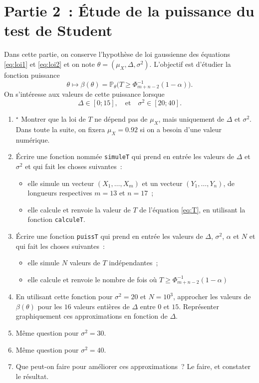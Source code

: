 \documentclass[a4paper,12pt,twosided]{article}
\newcommand{\prob}{\mathbb P}
\theoremstyle{definition}
\begin{document}
\section*{Partie 2~: Étude de la puissance du test de Student}

Dans cette partie, on conserve l'hypothèse de loi gaussienne des équations \eqref{eq:loi1} et
\eqref{eq:loi2} et on note $\theta=(\mu_X, \Delta, \sigma^2)$.
L'objectif est d'étudier la fonction puissance
\[
  \theta \mapsto \beta(\theta) = \prob_\theta\Big(T \ge \Phi_{m+n-2}^{-1}(1-\alpha)\Big).
\]
On s'intéresse aux valeurs de cette puissance lorsque
\begin{equation}
  \label{eq:intervalles}
  \Delta \in [0; 15],\quad \text{et} \quad  \sigma^2\in [20;40].
\end{equation}


\begin{enumerate}[\bf {2.}1.]
\item $^\star$ Montrer que la loi de $T$ ne dépend pas de $\mu_X$, mais uniquement de $\Delta$ et
  $\sigma^2$. Dans toute la suite, on fixera $\mu_X = 0.92$ si on a besoin d'une valeur numérique.
\item Écrire une fonction nommée \verb+simuleT+ qui prend en entrée les valeurs de $\Delta$ et
  $\sigma^2$ et qui fait les choses suivantes~:
  \begin{itemize}
  \item elle simule un vecteur $(X_1,\ldots, X_m)$ et un vecteur $(Y_1,\ldots, Y_n)$, de longueurs
    respectives $m=13$ et $n=17$~;
  \item elle calcule et renvoie la valeur de $T$ de l'équation \eqref{eq:T}, en utilisant la fonction \verb+calculeT+.
  \end{itemize}
\item Écrire une fonction \verb+puissT+ qui prend en entrée les valeurs de $\Delta$, $\sigma^2$, $\alpha$ et
  $N$ et qui fait les choses suivantes~:
  \begin{itemize}
  \item elle simule $N$ valeurs de $T$ indépendantes~;
  \item elle calcule et renvoie le nombre de fois où $T\ge \Phi_{m+n-2}^{-1}(1-\alpha)$
  \end{itemize}
\item En utilisant cette fonction pour $\sigma^2=20$ et $N=10^3$, approcher les valeurs de
  $\beta(\theta)$ pour les $16$ valeurs entières de $\Delta$ entre $0$ et $15$. Représenter
  graphiquement ces approximations en fonction de $\Delta$.
\item Même question pour $\sigma^2 = 30$.
\item Même question pour $\sigma^2=40$.
\item Que peut-on faire pour améliorer ces approximations~? Le faire, et constater le résultat.
\end{enumerate}
\end{document}
